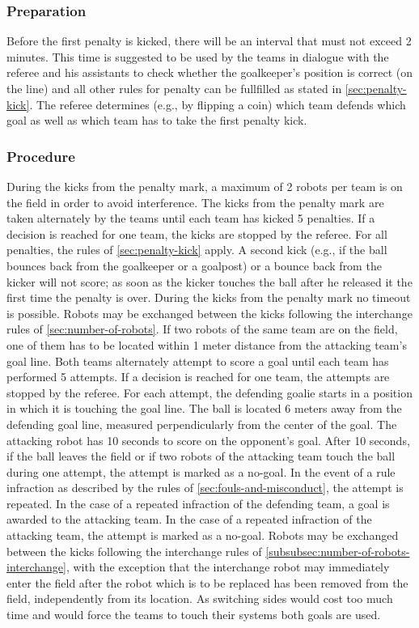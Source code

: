 \subsubsection{Preparation}
Before the first penalty is kicked, there will be an interval that must not exceed 2 minutes.
This time is suggested to be used by the teams in dialogue with the referee and his assistants to check whether the goalkeeper's position is correct (on the line) and all other rules for penalty can be fullfilled as stated in \autoref{sec:penalty-kick}.
The referee determines (e.g., by flipping a coin) which team defends which goal as well as which team has to take the first penalty kick.

\subsubsection{Procedure}
During the kicks from the penalty mark, a maximum of 2 robots per team is on the field in order to avoid interference.
The kicks from the penalty mark are taken alternately by the teams until each team has kicked 5 penalties.
If a decision is reached for one team, the kicks are stopped by the referee.
For all penalties, the rules of \autoref{sec:penalty-kick} apply.
A second kick (e.g., if the ball bounces back from the goalkeeper or a goalpost) or a bounce back from the kicker will not score; as soon as the kicker touches the ball after he released it the first time the penalty is over.
During the kicks from the penalty mark no timeout is possible.
Robots may be exchanged between the kicks following the interchange rules of \autoref{sec:number-of-robots}.
If two robots of the same team are on the field, one of them has to be located within 1 meter distance from the attacking team's
goal line.
Both teams alternately attempt to score
a goal until each team has performed 5 attempts. If a decision is reached for
one team, the attempts are stopped by the referee.
For each attempt, the defending goalie starts in a position in which it is
touching the goal line.
The ball is located 6 meters away from the defending goal line, measured
perpendicularly from the center of the goal.
The attacking robot has 10 seconds to score on the opponent's goal.
After 10 seconds, if the ball leaves the field or if two robots of the attacking team touch the ball during one attempt, the attempt is
marked as a no-goal.
In the event of a rule infraction as described by the rules of \autoref{sec:fouls-and-misconduct},
the attempt is repeated.
In the case of a repeated infraction of the defending team, a goal is
awarded to the attacking team.
In the case of a repeated infraction of the attacking team, the attempt
is marked as a no-goal.
Robots may be exchanged between the kicks following the interchange
rules of \autoref{subsubsec:number-of-robots-interchange}, with the exception
that the interchange robot may immediately enter the field after the robot which
is to be replaced has been removed from the field, independently from its
location.
As switching sides would cost too much time and would force the teams to touch their systems both goals are used.

